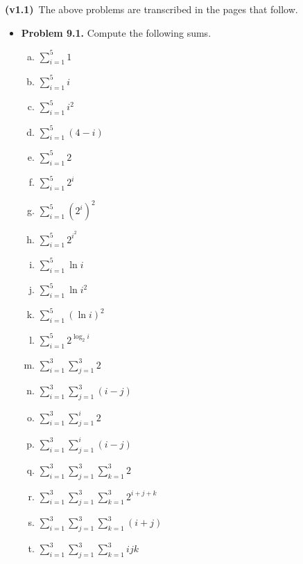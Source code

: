 \documentclass[11pt]{article}
\begin{document}
\vspace{0.1in}

\textbf{(v1.1)}~The above problems are transcribed in the pages that follow.

\newpage

\begin{itemize}

\item \textbf{Problem 9.1.}
Compute the following sums.
\begin{multicols}{3}
\begin{enumerate}[(a)]
\item $\displaystyle \sum_{i=1}^5 1$
\item $\displaystyle \sum_{i=1}^5 i$
\item $\displaystyle \sum_{i=1}^5 i^2$
\item $\displaystyle \sum_{i=1}^5 (4-i)$
\item $\displaystyle \sum_{i=1}^5 2$
\item $\displaystyle \sum_{i=1}^5 2^i$
\item $\displaystyle \sum_{i=1}^5 (2^i)^2$
\item $\displaystyle \sum_{i=1}^5 2^{i^2}$
\item $\displaystyle \sum_{i=1}^5 \ln i$
\item $\displaystyle \sum_{i=1}^5 \ln i^2$
\item $\displaystyle \sum_{i=1}^5 (\ln i)^2$
\item $\displaystyle \sum_{i=1}^5 2^{\log_2 i}$
\item $\displaystyle \sum_{i=1}^3 \sum_{j=1}^3 2$
\item $\displaystyle \sum_{i=1}^3 \sum_{j=1}^3 (i-j)$
\item $\displaystyle \sum_{i=1}^3 \sum_{j=1}^i 2$
\item $\displaystyle \sum_{i=1}^3 \sum_{j=1}^i (i-j)$
\item $\displaystyle \sum_{i=1}^3 \sum_{j=1}^3 \sum_{k=1}^3 2$
\item $\displaystyle \sum_{i=1}^3 \sum_{j=1}^3 \sum_{k=1}^3 2^{i+j+k}$
\item $\displaystyle \sum_{i=1}^3 \sum_{j=1}^3 \sum_{k=1}^3 (i+j)$
\item $\displaystyle \sum_{i=1}^3 \sum_{j=1}^3 \sum_{k=1}^3 ijk$
\end{enumerate}
\end{multicols}

\vspace{0.1in}


\end{itemize}
\end{document}
